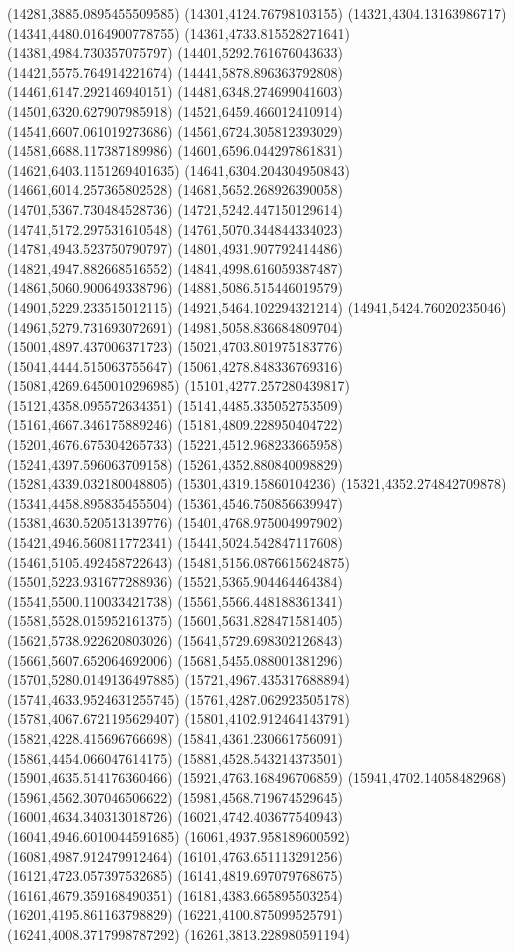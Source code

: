 {(14281,3885.0895455509585)
(14301,4124.76798103155)
(14321,4304.13163986717)
(14341,4480.0164900778755)
(14361,4733.815528271641)
(14381,4984.730357075797)
(14401,5292.761676043633)
(14421,5575.764914221674)
(14441,5878.896363792808)
(14461,6147.292146940151)
(14481,6348.274699041603)
(14501,6320.627907985918)
(14521,6459.466012410914)
(14541,6607.061019273686)
(14561,6724.305812393029)
(14581,6688.117387189986)
(14601,6596.044297861831)
(14621,6403.1151269401635)
(14641,6304.204304950843)
(14661,6014.257365802528)
(14681,5652.268926390058)
(14701,5367.730484528736)
(14721,5242.447150129614)
(14741,5172.297531610548)
(14761,5070.344844334023)
(14781,4943.523750790797)
(14801,4931.907792414486)
(14821,4947.882668516552)
(14841,4998.616059387487)
(14861,5060.900649338796)
(14881,5086.515446019579)
(14901,5229.233515012115)
(14921,5464.102294321214)
(14941,5424.76020235046)
(14961,5279.731693072691)
(14981,5058.836684809704)
(15001,4897.437006371723)
(15021,4703.801975183776)
(15041,4444.515063755647)
(15061,4278.848336769316)
(15081,4269.6450010296985)
(15101,4277.257280439817)
(15121,4358.095572634351)
(15141,4485.335052753509)
(15161,4667.346175889246)
(15181,4809.228950404722)
(15201,4676.675304265733)
(15221,4512.968233665958)
(15241,4397.596063709158)
(15261,4352.880840098829)
(15281,4339.032180048805)
(15301,4319.15860104236)
(15321,4352.274842709878)
(15341,4458.895835455504)
(15361,4546.750856639947)
(15381,4630.520513139776)
(15401,4768.975004997902)
(15421,4946.560811772341)
(15441,5024.542847117608)
(15461,5105.492458722643)
(15481,5156.0876615624875)
(15501,5223.931677288936)
(15521,5365.904464464384)
(15541,5500.110033421738)
(15561,5566.448188361341)
(15581,5528.015952161375)
(15601,5631.828471581405)
(15621,5738.922620803026)
(15641,5729.698302126843)
(15661,5607.652064692006)
(15681,5455.088001381296)
(15701,5280.0149136497885)
(15721,4967.435317688894)
(15741,4633.9524631255745)
(15761,4287.062923505178)
(15781,4067.6721195629407)
(15801,4102.912464143791)
(15821,4228.415696766698)
(15841,4361.230661756091)
(15861,4454.066047614175)
(15881,4528.543214373501)
(15901,4635.514176360466)
(15921,4763.168496706859)
(15941,4702.14058482968)
(15961,4562.307046506622)
(15981,4568.719674529645)
(16001,4634.340313018726)
(16021,4742.403677540943)
(16041,4946.6010044591685)
(16061,4937.958189600592)
(16081,4987.912479912464)
(16101,4763.651113291256)
(16121,4723.057397532685)
(16141,4819.697079768675)
(16161,4679.359168490351)
(16181,4383.665895503254)
(16201,4195.861163798829)
(16221,4100.875099525791)
(16241,4008.3717998787292)
(16261,3813.228980591194)
}
